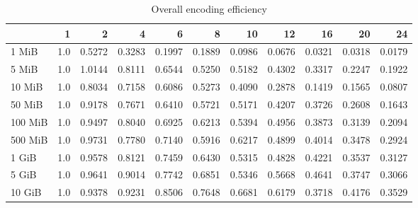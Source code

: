 \begin{table}[!h]
	\caption{Overall encoding efficiency}
	\begin{tabular}{lrrrrrrrrrr}
		\toprule
		\diagbox{File sizes }{Threads} &   1  &      2  &      4  &      6  &      8  &      10 &      12 &      16 &      20 &      24 \\
		\midrule
		1 MiB   &  1.0 &  0.5272 &  0.3283 &  0.1997 &  0.1889 &  0.0986 &  0.0676 &  0.0321 &  0.0318 &  0.0179 \\
		5 MiB   &  1.0 &  1.0144 &  0.8111 &  0.6544 &  0.5250 &  0.5182 &  0.4302 &  0.3317 &  0.2247 &  0.1922 \\
		10 MiB  &  1.0 &  0.8034 &  0.7158 &  0.6086 &  0.5273 &  0.4090 &  0.2878 &  0.1419 &  0.1565 &  0.0807 \\
		50 MiB  &  1.0 &  0.9178 &  0.7671 &  0.6410 &  0.5721 &  0.5171 &  0.4207 &  0.3726 &  0.2608 &  0.1643 \\
		100 MiB &  1.0 &  0.9497 &  0.8040 &  0.6925 &  0.6213 &  0.5394 &  0.4956 &  0.3873 &  0.3139 &  0.2094 \\
		500 MiB &  1.0 &  0.9731 &  0.7780 &  0.7140 &  0.5916 &  0.6217 &  0.4899 &  0.4014 &  0.3478 &  0.2924 \\
		1 GiB   &  1.0 &  0.9578 &  0.8121 &  0.7459 &  0.6430 &  0.5315 &  0.4828 &  0.4221 &  0.3537 &  0.3127 \\
		5 GiB   &  1.0 &  0.9641 &  0.9014 &  0.7742 &  0.6851 &  0.5346 &  0.5668 &  0.4641 &  0.3747 &  0.3066 \\
		10 GiB  &  1.0 &  0.9378 &  0.9231 &  0.8506 &  0.7648 &  0.6681 &  0.6179 &  0.3718 &  0.4176 &  0.3529 \\
		\bottomrule
	\end{tabular}
\end{table}
